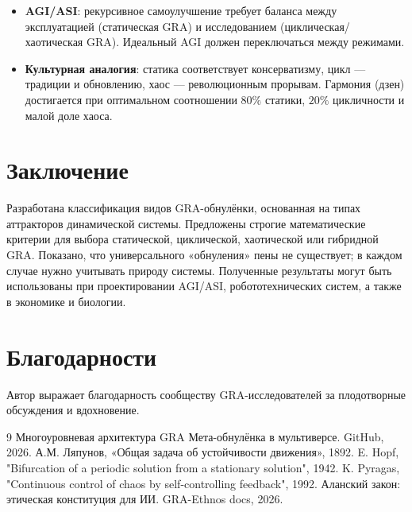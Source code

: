 \documentclass[12pt,a4paper]{article}
\begin{document}
\begin{itemize}
    \item \textbf{AGI/ASI}: рекурсивное самоулучшение требует баланса между эксплуатацией (статическая GRA) и исследованием (циклическая/хаотическая GRA). Идеальный AGI должен переключаться между режимами.
    \item \textbf{Культурная аналогия}: статика соответствует консерватизму, цикл — традиции и обновлению, хаос — революционным прорывам. Гармония (дзен) достигается при оптимальном соотношении \(80\%\) статики, \(20\%\) цикличности и малой доле хаоса.
\end{itemize}

\section{Заключение}

Разработана классификация видов GRA-обнулёнки, основанная на типах аттракторов динамической системы. Предложены строгие математические критерии для выбора статической, циклической, хаотической или гибридной GRA. Показано, что универсального «обнуления» пены не существует; в каждом случае нужно учитывать природу системы. Полученные результаты могут быть использованы при проектировании AGI/ASI, робототехнических систем, а также в экономике и биологии.

\section*{Благодарности}

Автор выражает благодарность сообществу GRA-исследователей за плодотворные обсуждения и вдохновение.

\begin{thebibliography}{9}
 Многоуровневая архитектура GRA Мета-обнулёнка в мультиверсе. GitHub, 2026.
 А.М. Ляпунов, «Общая задача об устойчивости движения», 1892.
 E. Hopf, "Bifurcation of a periodic solution from a stationary solution", 1942.
 K. Pyragas, "Continuous control of chaos by self-controlling feedback", 1992.
 Аланский закон: этическая конституция для ИИ. GRA-Ethnos docs, 2026.
\end{thebibliography}
\end{document}
